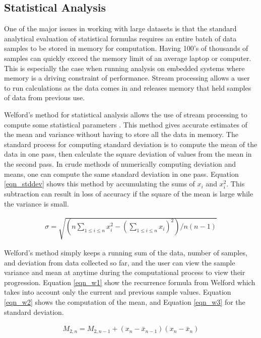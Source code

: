 \documentclass[11pt,sigconf]{acmart}
\begin{document}
\subsection{Statistical Analysis}
One of the major issues in working with large datasets is that the standard analytical
evaluation of statistical formulas requires an entire batch of data samples to
be stored in memory for computation. Having 100's of thousands of samples can
quickly exceed the memory limit of an average laptop or computer. This is especially
the case when running analysis on embedded systems where memory is a driving constraint
of performance. Stream processing allows a user to run calculations as the data comes in
and releases memory that held samples of data from previous use.

Welford's method for statistical analysis allows the use of stream processing to
compute some statistical parameters \cite{welford}. This method gives accurate estimates of the 
mean and variance without having to store all the data in memory. The standard process for computing
standard deviation is to compute the mean of the data in one pass, then calculate the square
deviation of values from the mean in the second pass. In crude methods of numerically computing
deviation and means, one can compute the same standard deviation in one pass. Equation \ref{eqn_stddev} shows
this method by accumulating the sums of $x_i$ and $x_{i}^{2}$. This subtraction can result in 
loss of accuracy if the square of the mean is large while the variance is small.

\begin{equation} \label{eqn_stddev}
  \begin{split}
    \sigma =\sqrt{(n\sum_{1\leq i\leq n}x_{i}^{2}-(\sum_{1\leq i\leq n} x_{i})^2)/n(n-1)}
  \end{split}
\end{equation}

Welford's method simply keeps a running sum of the data, number of samples, 
and deviation from data collected so far, and the user can view the sample variance and
mean at anytime during the computational process to view their progression. Equation \ref{eqn_w1} show
the recurrence formula from Welford which takes into account only the current and previous sample values.
Equation \ref{eqn_w2} shows the computation of the mean, and Equation \ref{eqn_w3} for the standard deviation. 

\begin{equation} \label{eqn_w1}
  \begin{split}
    M_{2,n}=M_{2,n-1}+(x_n -\bar{x}_{n-1})(x_n -\bar{x}_{n})
  \end{split}
\end{equation}
\end{document}
